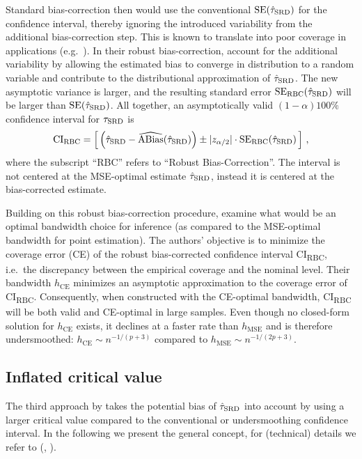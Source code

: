 Standard bias-correction then would use the conventional $\operatorname{SE}(\hat{\tau}_{\textup{SRD}})$ for the confidence interval,
thereby ignoring the introduced variability from the additional bias-correction step.
This is known to translate into poor coverage in applications (e.g.\ \cite{Hall_1992}).
In their robust bias-correction, \textcite{Calonico_2014} account for the additional variability
by allowing the estimated bias to converge in distribution to a random variable and contribute to the distributional approximation of $\hat{\tau}_{\textup{SRD}}$.
The new asymptotic variance is larger,
and the resulting standard error $\operatorname{SE}_{\text{RBC}}(\hat{\tau}_{\textup{SRD}})$ will be larger than $\operatorname{SE}(\hat{\tau}_{\textup{SRD}})$.
All together, an asymptotically valid ${(1-\alpha)100\%}$ confidence interval for $\tau_{\textup{SRD}}$ is
\begin{equation}
	\text{CI}_{\text{RBC}} = \left[\, \left(\hat{\tau}_{\textup{SRD}} - \widehat{\operatorname{ABias}}(\hat{\tau}_{\textup{SRD}})\right) \pm |z_{\alpha/2}| \cdot \operatorname{SE}_{\text{RBC}}(\hat{\tau}_{\textup{SRD}}) \,\right] \,,
\end{equation}
where the subscript \enquote{RBC} refers to \enquote{Robust Bias-Correction}.
The interval is not centered at the MSE-optimal estimate $\hat{\tau}_{\textup{SRD}}$, instead it is centered at the bias-corrected estimate.

Building on this robust bias-correction procedure, \textcite{Calonico_2020} examine what would be an optimal bandwidth choice for inference
(as compared to the MSE-optimal bandwidth for point estimation).
The authors' objective is to minimize the coverage error (CE) of the robust bias-corrected confidence interval CI\textsubscript{RBC},
i.e.\ the discrepancy between the empirical coverage and the nominal level.
Their bandwidth $h_{\text{CE}}$ minimizes an asymptotic approximation to the coverage error of CI\textsubscript{RBC}.
Consequently, when constructed with the CE-optimal bandwidth, CI\textsubscript{RBC} will be both valid and CE-optimal in large samples.
Even though no closed-form solution for $h_{\text{CE}}$ exists, it declines at a faster rate than $h_{\text{MSE}}$ and is therefore undersmoothed:
$h_{\text{CE}} \sim n^{-1/(p+3)}$ compared to $h_{\text{MSE}} \sim n^{-1/(2p+3)}$.

\subsection{Inflated critical value} \label{sec:AK}

The third approach by \textcite{Armstrong_2020} takes the potential bias of $\hat{\tau}_{\textup{SRD}}$ into account
by using a larger critical value compared to the conventional or undersmoothing confidence interval.
In the following we present the general concept, for (technical) details we refer to \citeauthor{Armstrong_2020} (\citeyear{Armstrong_2020}, \citeyear{Armstrong_2018}).

